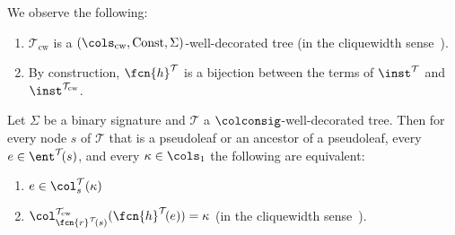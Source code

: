 \begin{observation}\label{obs:hcwtocw-bin}
	We observe the following:
	\begin{enumerate}
		\item \label{item:obshcwtocw-bin-1} $\mathcal{T}_{\mathrm{cw}}$ is a $(\cols_{\mathrm{cw}}, \mathrm{Const}, \Sigma)$-well-decorated tree (in the cliquewidth sense~\cite[Definition 6]{ICDT2023}).
		\item \label{item:obshcwtocw-bin-2} By construction, $\fcn{h}^{\mathcal{T}}$ is a bijection between the terms of $ \inst^{\mathcal{T}}$ and $\inst^{\mathcal{T}_{\mathrm{cw}}}$.
	\end{enumerate}
\end{observation}
\begin{lemma}\label{lem:hcwtocw-bin-cols}
	Let $\Sigma$ be a binary signature and $\mathcal{T}$ a $\colconsig$-well-decorated tree. Then for every node $s$ of $\mathcal{T}$ that is a pseudoleaf or an ancestor of a pseudoleaf, every $e\in\ent^{\mathcal{T}}\!(s)$, and every $\kappa\in\cols_1$ the following are equivalent:
	\begin{enumerate}
		\item $e\in\col_s^{\mathcal{T}}(\kappa)$
		\item $\col_{\fcn{r}^{\mathcal{T}}\!(s)}^{\mathcal{T}_{\mathrm{cw}}}(\fcn{h}^{\mathcal{T}}\!(e)) = \kappa$ (in the cliquewidth sense~\cite[Definition 7]{ICDT2023}).
	\end{enumerate}
\end{lemma}
